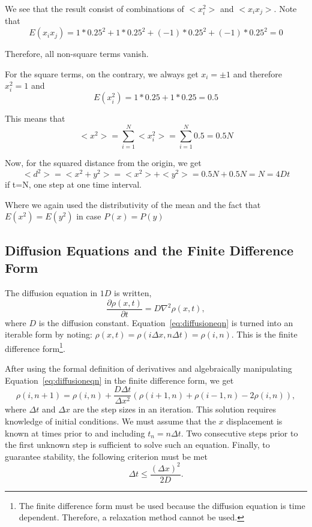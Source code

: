 \documentclass[12pt]{article}
\begin{document}
We see that the result consist of combinations of $<x_i^2>$ and $<x_ix_j>$. Note that 
\begin{equation}
    E(x_ix_j)=1*0.25^2+1*0.25^2+(-1)*0.25^2+(-1)*0.25^2=0
\end{equation}

Therefore, all non-square terms vanish.

For the square terms, on the contrary, we always get $x_i=\pm 1$ and therefore $x_i^2=1$ and
\begin{equation}
    E(x_i^2)=1*0.25+1*0.25=0.5
\end{equation}

This means that 
\begin{equation}
    <x^2>=\sum_{i=1}^N <x_i^2>=\sum_{i=1}^N 0.5=0.5N
\end{equation}

Now, for the squared distance from the origin, we get
\begin{equation}
    <d^2>=<x^2+y^2>=<x^2>+<y^2>=0.5N+0.5N=N=4Dt
\end{equation}
if t=N, one step at one time interval.

Where we again used the distributivity of the mean and the fact that $E(x^2)=E(y^2)$ in case $P(x)=P(y)$


\subsection{Diffusion Equations and the Finite Difference Form}
\label{sec:diffusionequation}
The diffusion equation in $1D$ is written,
\begin{equation}
  \label{eq:diffusioneqn}
  \frac{\partial\rho(x,t)}{\partial t} = D\nabla^2\rho(x,t),
\end{equation}
where $D$ is the diffusion constant. Equation~\ref{eq:diffusioneqn} is turned into an iterable form by noting: $\rho(x,t) = \rho(i\Delta x, n\Delta t) = \rho(i,n)$. This is the finite difference form\footnote{The finite difference form must be used because the diffusion equation is time dependent. Therefore, a relaxation method cannot be used.}.

After using the formal definition of derivatives and algebraically manipulating Equation~\ref{eq:diffusioneqn} in the finite difference form, we get
\begin{equation}
  \label{eq:diffusioneqn-iterable}
  \rho(i,n+1) = \rho(i,n) + \frac{D\Delta t}{\Delta x^2}\left(\rho(i+1,n) + \rho(i-1,n) - 2\rho(i,n)\right),
\end{equation}
where $\Delta t$ and $\Delta x$ are the step sizes in an iteration. This solution requires knowledge of initial conditions. We must assume that the $x$ displacement is known at times prior to and including $t_n = n\Delta t$. Two consecutive steps prior to the first unknown step is sufficient to solve such an equation. Finally, to guarantee stability, the following criterion must be met
\begin{equation}
  \label{eq:stabilitycriterion}
  \Delta t \leq \frac{(\Delta x)^2}{2D}.
\end{equation}
\end{document}
